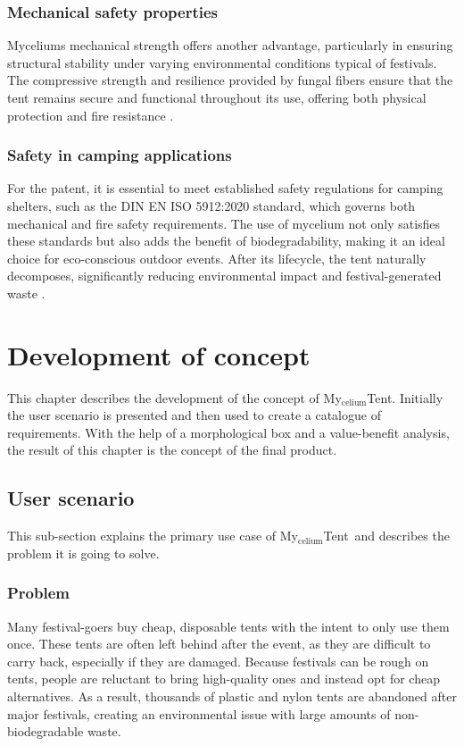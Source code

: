 \documentclass{article}
\newcommand{\myc}{My$_{\text{celium}}$Tent}
\begin{document}
\subsubsection{Mechanical safety properties}
Myceliums mechanical strength offers another advantage, particularly in ensuring
structural stability under varying environmental conditions typical of festivals. The
compressive strength and resilience provided by fungal fibers ensure that the tent remains
secure and functional throughout its use, offering both physical protection and fire
resistance \parencite{polym16020262}.

\subsubsection{Safety in camping applications}
For the patent, it is essential to meet established safety regulations for camping
shelters, such as the DIN EN ISO 5912:2020 standard, which governs both mechanical and
fire safety requirements. The use of mycelium not only satisfies these standards but also
adds the benefit of biodegradability, making it an ideal choice for eco-conscious outdoor
events. After its lifecycle, the tent naturally decomposes, significantly reducing
environmental impact and festival-generated waste \parencite{din2020}.

\newpage
\section{Development of concept}
This chapter describes the development of the concept of \myc.
Initially the user scenario is presented and then used to create a catalogue of
requirements. With the help of a morphological box and a value-benefit analysis, the
result of this chapter is the concept of the final product.

\subsection{User scenario}
This sub-section explains the primary use case of \myc\ and describes the problem it is
going to solve. 

\subsubsection{Problem}
Many festival-goers buy cheap, disposable tents with the intent to only use them once.
These tents are often left behind after the event, as they are difficult to carry back,
especially if they are damaged. Because festivals can be rough on tents, people are
reluctant to bring high-quality ones and instead opt for cheap alternatives. As a result,
thousands of plastic and nylon tents are abandoned after major festivals, creating an
environmental issue with large amounts of non-biodegradable waste.
\end{document}
